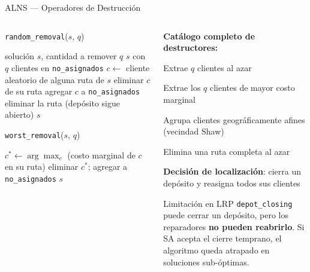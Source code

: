 \documentclass[aspectratio=169,10pt]{beamer}
\begin{document}
\begin{frame}{ALNS --- Operadores de Destrucción}
  \begin{columns}[T,onlytextwidth]
    \begin{column}{0.50\textwidth}
      \begin{algorithm}[H]
        \caption{\small \texttt{random\_removal}($s$, $q$)}
        \begin{algorithmic}[1]\tiny
          \Require solución $s$, cantidad a remover $q$
          \Ensure  $s$ con $q$ clientes en \texttt{no\_asignados}
            \State $c \gets$ cliente aleatorio de alguna ruta de $s$
            \State eliminar $c$ de su ruta
            \State agregar $c$ a \texttt{no\_asignados}
              \State eliminar la ruta (depósito sigue abierto)
            \EndIf
          \EndFor
          \State \Return $s$
        \end{algorithmic}
      \end{algorithm}
      \vspace{0.2em}
      \begin{algorithm}[H]
        \caption{\small \texttt{worst\_removal}($s$, $q$)}
        \begin{algorithmic}[1]\tiny
            \State $c^* \gets \arg\max_{c}$ (costo marginal de $c$ en su ruta)
            \State eliminar $c^*$; agregar a \texttt{no\_asignados}
          \EndFor
          \State \Return $s$
        \end{algorithmic}
      \end{algorithm}
    \end{column}
    \begin{column}{0.48\textwidth}
      \textbf{Catálogo completo de destructores:}
      \vspace{0.3em}
      \begin{description}\footnotesize
        \item[\texttt{random\_removal}] Extrae $q$ clientes al azar
        \item[\texttt{worst\_removal}] Extrae los $q$ clientes de mayor costo marginal
        \item[\texttt{shaw\_removal}] Agrupa clientes geográficamente afines (vecindad Shaw)
        \item[\texttt{route\_removal}] Elimina una ruta completa al azar
        \item[\texttt{depot\_closing}] \textbf{Decisión de localización}: cierra un depósito y reasigna todos sus clientes
      \end{description}
      \vspace{0.3em}
      \begin{alertblock}{Limitación en LRP}\footnotesize
        \texttt{depot\_closing} puede cerrar un depósito, pero los reparadores \textbf{no pueden reabrirlo}. Si SA acepta el cierre temprano, el algoritmo queda atrapado en soluciones sub-óptimas.
      \end{alertblock}
    \end{column}
  \end{columns}
\end{frame}
\end{document}
